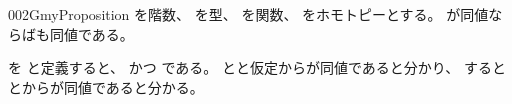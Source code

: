 \documentclass[index]{subfiles}
\begin{document}
\begin{myBlock}{002G}{myProposition}
  を階数、
  を型、
  を関数、
  をホモトピーとする。
  が同値ならばも同値である。
\end{myBlock}
\begin{myProof}
  を
  と定義すると、
  かつ
  である。
  とと仮定からが同値であると分かり、
  するととからが同値であると分かる。
\end{myProof}
\end{document}
